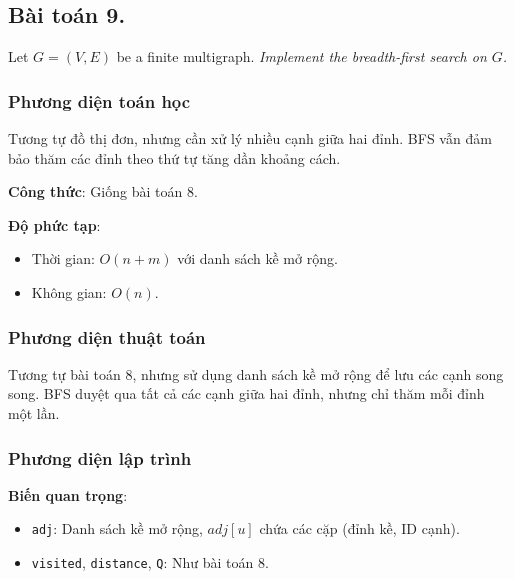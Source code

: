 \documentclass[a4paper,12pt]{article}
\begin{document}
\subsection{Bài toán 9.} Let $G = (V, E)$ be a finite multigraph. \textit{Implement the breadth-first search on $G$.}

\subsubsection{Phương diện toán học}
Tương tự đồ thị đơn, nhưng cần xử lý nhiều cạnh giữa hai đỉnh. BFS vẫn đảm bảo thăm các đỉnh theo thứ tự tăng dần khoảng cách.

\textbf{Công thức}: Giống bài toán 8.

\textbf{Độ phức tạp}: 
\begin{itemize}
    \item Thời gian: \( O(n + m) \) với danh sách kề mở rộng.
    \item Không gian: \( O(n) \).
\end{itemize}

\subsubsection{Phương diện thuật toán}
Tương tự bài toán 8, nhưng sử dụng danh sách kề mở rộng để lưu các cạnh song song. BFS duyệt qua tất cả các cạnh giữa hai đỉnh, nhưng chỉ thăm mỗi đỉnh một lần.

\subsubsection{Phương diện lập trình}
\textbf{Biến quan trọng}:
\begin{itemize}
    \item \texttt{adj}: Danh sách kề mở rộng, \( adj[u] \) chứa các cặp (đỉnh kề, ID cạnh).
    \item \texttt{visited}, \texttt{distance}, \texttt{Q}: Như bài toán 8.
\end{itemize}
\end{document}
